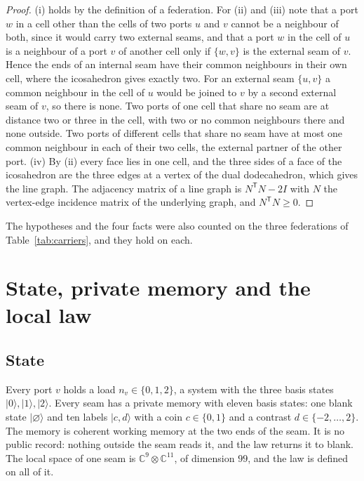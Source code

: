 \documentclass[11pt]{article}
\theoremstyle{definition}
\theoremstyle{remark}
\theoremstyle{plain}
\newcommand{\ket}[1]{\lvert #1\rangle}
\newcommand{\C}{\mathbb{C}}
\newcommand{\blank}{\varnothing}
\begin{document}
\begin{proof}
(i) holds by the definition of a federation. For (ii) and (iii) note that a
port $w$ in a cell other than the cells of two ports $u$ and $v$ cannot be a
neighbour of both, since it would carry two external seams, and that a port
$w$ in the cell of $u$ is a neighbour of a port $v$ of another cell only if
$\{w,v\}$ is the external seam of $v$. Hence the ends of an internal seam
have their common neighbours in their own cell, where the icosahedron gives
exactly two. For an external seam $\{u,v\}$ a common neighbour in the cell
of $u$ would be joined to $v$ by a second external seam of $v$, so there is
none. Two ports of one cell that share no seam are at distance two or three
in the cell, with two or no common neighbours there and none outside. Two
ports of different cells that share no seam have at most one common
neighbour in each of their two cells, the external partner of the other
port. (iv) By (ii) every face lies in one cell, and the three sides of a
face of the icosahedron are the three edges at a vertex of the dual
dodecahedron, which gives the line graph. The adjacency matrix of a line
graph is $N^{\mathsf T}N-2I$ with $N$ the vertex-edge incidence matrix of
the underlying graph, and $N^{\mathsf T}N\ge0$.
\end{proof}

The hypotheses and the four facts were also counted on the three
federations of Table~\ref{tab:carriers}, and they hold on each.


\section{State, private memory and the local law}
\label{sec:local}

\subsection{State}

Every port $v$ holds a load $n_v\in\{0,1,2\}$, a system with the three basis
states $\ket{0},\ket{1},\ket{2}$. Every seam has a private memory with
eleven basis states: one blank state $\ket{\blank}$ and ten labels
$\ket{c,d}$ with a coin $c\in\{0,1\}$ and a contrast $d\in\{-2,\dots,2\}$.
The memory is coherent working memory at the two ends of the seam. It is no
public record: nothing outside the seam reads it, and the law returns it to
blank. The local space of one seam is $\C^{9}\otimes\C^{11}$, of dimension
$99$, and the law is defined on all of it.
\end{document}
